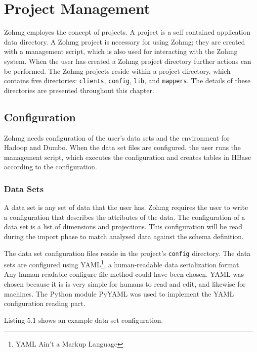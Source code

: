 \section{Project Management}

Zohmg employes the concept of projects. A project is a self contained
application data directory. A Zohmg project is necessary for using Zohmg; they
are created with a management script, which is also used for interacting with
the Zohmg system. When the user has created a Zohmg project directory further
actions can be performed. The Zohmg projects reside within a project directory,
which contains five directories: \texttt{clients}, \texttt{config},
\texttt{lib}, and \texttt{mappers}. The details of these directories are
presented throughout this chapter.


\subsection*{Configuration}

Zohmg needs configuration of the user's data sets and the environment for Hadoop
and Dumbo. When the data set files are configured, the user runs the management
script, which executes the configuration and creates tables in HBase according
to the configuration.


\subsubsection*{Data Sets}

A data set is any set of data that the user has. Zohmg requires the user to
write a configuration that describes the attributes of the data. The
configuration of a data set is a list of dimensions and projections. This
configuration will be read during the import phase to match analysed data
against the schema definition.

The data set configuration files reside in the project's \texttt{config}
directory. The data sets are configured using YAML\footnote{YAML Ain't a Markup
Language}, a human-readable data serialization format. Any human-readable
configure file method could have been chosen. YAML was chosen because it is is
very simple for humans to read and edit, and likewise for machines. The Python
module PyYAML was used to implement the YAML configuration reading part.
\cite{pyyaml}

Listing 5.1 shows an example data set configuration.

\vspace{12pt}

